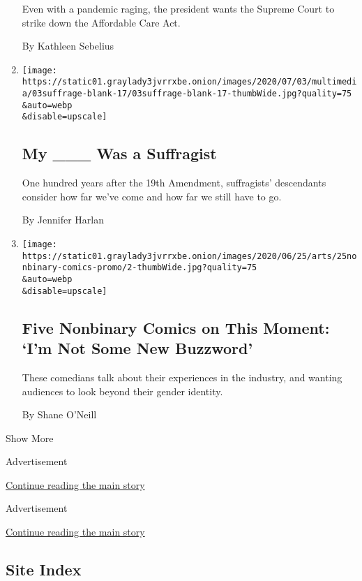 \begin{enumerate}
  Even with a pandemic raging, the president wants the Supreme Court to
  strike down the Affordable Care Act.

  By Kathleen Sebelius
\item
  \href{/2020/07/02/style/woman-suffrage-movement-descend.html}{}

  \texttt{[image: https://static01.graylady3jvrrxbe.onion/images/2020/07/03/multimedia/03suffrage-blank-17/03suffrage-blank-17-thumbWide.jpg?quality=75\\\&auto=webp\\\&disable=upscale]}

  \hypertarget{my-___-was-a-suffragist}{%
  \subsection{My \_\_\_ Was a
  Suffragist}\label{my-___-was-a-suffragist}}

  One hundred years after the 19th Amendment, suffragists' descendants
  consider how far we've come and how far we still have to go.

  By Jennifer Harlan
\item
  \href{/2020/06/25/arts/nonbinary-comedians-pride-coronavirus.html}{}

  \texttt{[image: https://static01.graylady3jvrrxbe.onion/images/2020/06/25/arts/25nonbinary-comics-promo/2-thumbWide.jpg?quality=75\\\&auto=webp\\\&disable=upscale]}

  \hypertarget{five-nonbinary-comics-on-this-moment-im-not-some-new-buzzword}{%
  \subsection{Five Nonbinary Comics on This Moment: `I'm Not Some New
  Buzzword'}\label{five-nonbinary-comics-on-this-moment-im-not-some-new-buzzword}}

  These comedians talk about their experiences in the industry, and
  wanting audiences to look beyond their gender identity.

  By Shane O'Neill
\end{enumerate}

Show More

Advertisement

\protect\hyperlink{after-mid1}{Continue reading the main story}

Advertisement

\protect\hyperlink{after-mktg}{Continue reading the main story}

\hypertarget{site-index}{%
\subsection{Site Index}\label{site-index}}

